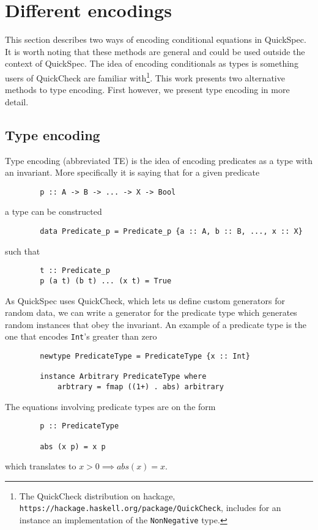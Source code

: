 \section{Different encodings}\label{encodings}

    This section describes two 
    ways of encoding conditional
    equations in QuickSpec. It is
    worth noting that these methods
    are general and could be used outside
    the context of QuickSpec. The
    idea of encoding conditionals
    as types is something users of
    QuickCheck\cite{Claessen2000}
    are familiar with\footnote{The QuickCheck distribution
    on hackage, \texttt{https://hackage.haskell.org/package/QuickCheck}, includes for an instance an implementation
    of the \texttt{NonNegative} type.}. 
    This work presents two alternative methods
    to type encoding. First however, we present type encoding
    in more detail.

    \subsection{Type encoding}\label{TE}

        Type encoding (abbreviated TE) is the idea of encoding
        predicates as a type with an invariant.
        More specifically
        it is saying that for a given predicate
        \begin{verbatim}
        p :: A -> B -> ... -> X -> Bool
        \end{verbatim}
        a type can be constructed
        \begin{verbatim}
        data Predicate_p = Predicate_p {a :: A, b :: B, ..., x :: X}
        \end{verbatim}
        such that 
        \begin{verbatim}
        t :: Predicate_p
        p (a t) (b t) ... (x t) = True
        \end{verbatim}
        As QuickSpec uses QuickCheck, which lets us define
        custom generators for random data, we can write a generator for 
        the predicate type which generates random instances that obey the invariant.
        An example of a predicate type is the one that encodes \texttt{Int}'s greater than zero
        \begin{verbatim}
        newtype PredicateType = PredicateType {x :: Int}

        instance Arbitrary PredicateType where
            arbtrary = fmap ((1+) . abs) arbitrary
        \end{verbatim}
        The equations involving predicate types are on the form
        \begin{verbatim}
        p :: PredicateType

        abs (x p) = x p

        \end{verbatim}
        which translates to $x > 0 \implies abs(x) = x$.

